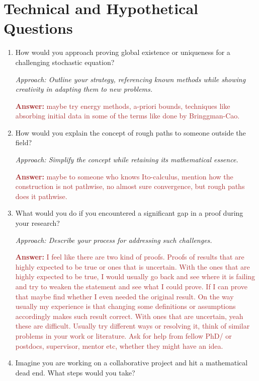 \documentclass[12pt]{article}
\numberwithin{equation}{section}
\newcommand{\brown}[1]{\textcolor{brown}{#1}}
\begin{document}
\section{Technical and Hypothetical Questions}
\begin{enumerate}
    \item How would you approach proving global existence or uniqueness for a challenging stochastic equation?
    
    \textit{Approach: Outline your strategy, referencing known methods while showing creativity in adapting them to new problems.}

    \brown{\textbf{Answer:} maybe try energy methods, a-priori bounds, techniques like absorbing initial data in some of the terms like done by Bringgman-Cao.}

    \item How would you explain the concept of rough paths to someone outside the field?
    
    \textit{Approach: Simplify the concept while retaining its mathematical essence.}

    \brown{\textbf{Answer:} maybe to someone who knows Ito-calculus, mention how the construction is not pathwise, no almost sure convergence, but rough paths does it pathwise.}
    
    \item What would you do if you encountered a significant gap in a proof during your research?
    
    \textit{Approach: Describe your process for addressing such challenges.}

    \brown{\textbf{Answer:} I feel like there are two kind of proofs. Proofs of results that are highly expected to be true or ones that is uncertain. With the ones that are highly expected to be true, I would usually go back and see where it is failing and try to weaken the statement and see what I could prove. If I can prove that maybe find whether I even needed the original result. On the way usually my experience is that changing some definitions or assumptions accordingly makes such result correct. With ones that are uncertain, yeah these are difficult. Usually try different ways or resolving it, think of similar problems in your work or literature. Ask for help from fellow PhD/ or postdocs, supervisor, mentor etc, whether they might have an idea. }

    \item Imagine you are working on a collaborative project and hit a mathematical dead end. What steps would you take?
    

\end{enumerate}
\end{document}

